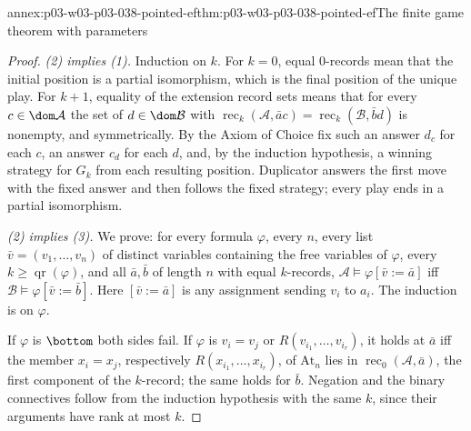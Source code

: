 \begin{annexitem}{annex:p03-w03-p03-038-pointed-ef}{thm:p03-w03-p03-038-pointed-ef}{The finite game theorem with parameters}
\begin{proof}
\emph{(2) implies (1).} Induction on \(k\). For \(k=0\), equal \(0\)-records
mean that the initial position is a partial isomorphism, which is the final
position of the unique play. For \(k+1\), equality of the extension record
sets means that for every \(c\in\dom\mathcal A\) the set of
\(d\in\dom\mathcal B\) with
\(\operatorname{rec}_k(\mathcal A,\bar ac)=\operatorname{rec}_k(\mathcal B,\bar bd)\)
is nonempty, and symmetrically. By the Axiom of Choice fix such an answer
\(d_c\) for each \(c\), an answer \(c_d\) for each \(d\), and, by the
induction hypothesis, a winning strategy for
\(G_k\) from each resulting position. Duplicator answers the first move with
the fixed answer and then follows the fixed strategy; every play ends in a
partial isomorphism.

\emph{(2) implies (3).} We prove: for every formula \(\varphi\), every \(n\),
every list \(\bar v=(v_1,\ldots,v_n)\) of distinct variables containing the
free variables of \(\varphi\), every \(k\ge\operatorname{qr}(\varphi)\), and all
\(\bar a,\bar b\) of length \(n\) with equal \(k\)-records,
\(\mathcal A\models\varphi[\bar v:=\bar a]\) iff
\(\mathcal B\models\varphi[\bar v:=\bar b]\). Here \([\bar v:=\bar a]\) is any
assignment sending \(v_i\) to \(a_i\). The induction is on \(\varphi\).

If \(\varphi\) is \(\bottom\) both sides fail. If \(\varphi\) is
\(v_i=v_j\) or \(R(v_{i_1},\ldots,v_{i_r})\), it holds at \(\bar a\) iff the
member \(x_i=x_j\), respectively \(R(x_{i_1},\ldots,x_{i_r})\), of
\(\mathrm{At}_n\) lies in \(\operatorname{rec}_0(\mathcal A,\bar a)\), the
first component of the \(k\)-record; the same holds for \(\bar b\). Negation
and the binary connectives follow from the induction hypothesis with the same
\(k\), since their arguments have rank at most \(k\).


\end{proof}
\end{annexitem}
